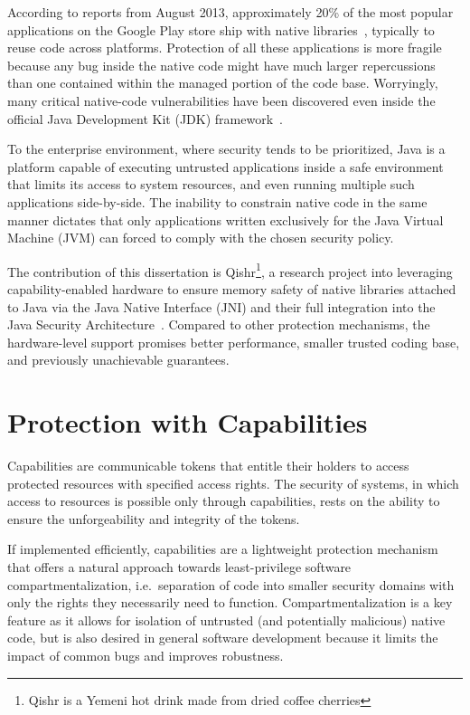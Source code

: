 \documentclass[a4paper,12pt,twoside,openright]{report}
\begin{document}
According to reports from August 2013, approximately 20\% of the most popular applications on the Google Play store ship with native libraries~\cite{poeplau2014execute}, typically to reuse code across platforms. Protection of all these applications is more fragile because any bug inside the native code might have much larger repercussions than one contained within the managed portion of the code base. Worryingly, many critical native-code vulnerabilities have been discovered even inside the official Java Development Kit (JDK) framework~\cite{Tan:2008:ESS:1496711.1496736}.

To the enterprise environment, where security tends to be prioritized, Java is a platform capable of executing untrusted applications inside a safe environment that limits its access to system resources, and even running multiple such applications side-by-side. The inability to constrain native code in the same manner dictates that only applications written exclusively for the Java Virtual Machine (JVM) can forced to comply with the chosen security policy.
 
The contribution of this dissertation is Qishr\footnote{Qishr is a Yemeni hot drink made from dried coffee cherries}, a research project into leveraging capability-enabled hardware to ensure memory safety of native libraries attached to Java via the Java Native Interface (JNI) and their full integration into the Java Security Architecture~\cite{Gong:1997:GBS:1267279.1267289}. Compared to other protection mechanisms, the hardware-level support promises better performance, smaller trusted coding base, and previously unachievable guarantees.

\section{Protection with Capabilities}

Capabilities are communicable tokens that entitle their holders to access protected resources with specified access rights. The security of systems, in which access to resources is possible only through capabilities, rests on the ability to ensure the unforgeability and integrity of the tokens.
 
If implemented efficiently, capabilities are a lightweight protection mechanism that offers a natural approach towards least-privilege software compartmentalization, i.e.\ separation of code into smaller security domains with only the rights they necessarily need to function. Compartmentalization is a key feature as it allows for isolation of untrusted (and potentially malicious) native code, but is also desired in general software development because it limits the impact of common bugs and improves robustness.
\end{document}
